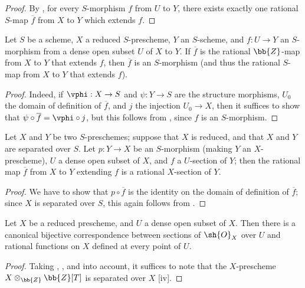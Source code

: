 \begin{proof}
By , for every $S$-morphism $f$ from $U$ to $Y$, there exists exactly one rational $S$-map $\overline{f}$ from $X$ to $Y$ which extends $f$.
\end{proof}

\begin{corollary}[7.2.4]
\label{I.7.2.4}
Let $S$ be a scheme, $X$ a reduced $S$-prescheme, $Y$ an $S$-scheme, and $f:U\to Y$ an $S$-morphism from a dense open subset $U$ of $X$ to $Y$.
If $\overline{f}$ is the rational $\bb{Z}$-map from $X$ to $Y$ that extends $f$, then $\overline{f}$ is an $S$-morphism (and thus the rational $S$-map from $X$ to $Y$ that extends $f$).
\end{corollary}

\begin{proof}
Indeed, if $\vphi:X\to S$ and $\psi:Y\to S$ are the structure morphisms, $U_0$ the domain of definition of $\overline{f}$, and $j$ the injection $U_0\to X$, then it suffices to show that $\psi\circ\overline{f}=\vphi\circ j$, but this follows from , since $f$ is an $S$-morphism.
\end{proof}

\begin{corollary}[7.2.5]
\label{I.7.2.5}
Let $X$ and $Y$ be two $S$-preschemes; suppose that $X$ is reduced, and that $X$ and $Y$ are separated over $S$.
Let $p:Y\to X$ be an $S$-morphism (making $Y$ an $X$-prescheme), $U$ a dense open subset of $X$, and $f$ a $U$-section of $Y$; then the rational map $\overline{f}$ from $X$ to $Y$ extending $f$ is a rational $X$-section of $Y$.
\end{corollary}

\begin{proof}
We
have to show that $p\circ\overline{f}$ is the identity on the domain of definition of $\overline{f}$; since $X$ is separated over $S$, this again follows from .
\end{proof}

\begin{corollary}[7.2.6]
\label{I.7.2.6}
Let $X$ be a reduced prescheme, and $U$ a dense open subset of $X$.
Then there is a canonical bijective correspondence between sections of $\sh{O}_X$ over $U$ and rational functions on $X$ defined at every point of $U$.
\end{corollary}

\begin{proof}
Taking , , and  into account, it suffices to note that the $X$-prescheme $X\otimes_{\bb{Z}}\bb{Z}[T]$ is separated over $X$ [iv].
\end{proof}

